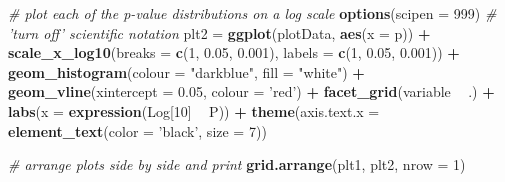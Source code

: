 \documentclass[]{book}
\newenvironment{Shaded}{\begin{snugshade}}{\end{snugshade}}
\newcommand{\CommentTok}[1]{\textcolor[rgb]{0.56,0.35,0.01}{\textit{#1}}}
\newcommand{\DataTypeTok}[1]{\textcolor[rgb]{0.13,0.29,0.53}{#1}}
\newcommand{\DecValTok}[1]{\textcolor[rgb]{0.00,0.00,0.81}{#1}}
\newcommand{\FloatTok}[1]{\textcolor[rgb]{0.00,0.00,0.81}{#1}}
\newcommand{\KeywordTok}[1]{\textcolor[rgb]{0.13,0.29,0.53}{\textbf{#1}}}
\newcommand{\NormalTok}[1]{#1}
\newcommand{\OperatorTok}[1]{\textcolor[rgb]{0.81,0.36,0.00}{\textbf{#1}}}
\newcommand{\StringTok}[1]{\textcolor[rgb]{0.31,0.60,0.02}{#1}}
\begin{document}
\begin{Shaded}
\begin{Highlighting}[]
\CommentTok{# plot each of the p-value distributions on a log scale}
\KeywordTok{options}\NormalTok{(}\DataTypeTok{scipen =} \DecValTok{999}\NormalTok{) }\CommentTok{# 'turn off' scientific notation}
\NormalTok{plt2 =}\StringTok{ }\KeywordTok{ggplot}\NormalTok{(plotData, }\KeywordTok{aes}\NormalTok{(}\DataTypeTok{x =}\NormalTok{ p)) }\OperatorTok{+}
\KeywordTok{scale_x_log10}\NormalTok{(}\DataTypeTok{breaks =} \KeywordTok{c}\NormalTok{(}\DecValTok{1}\NormalTok{, }\FloatTok{0.05}\NormalTok{, }\FloatTok{0.001}\NormalTok{),}
\DataTypeTok{labels =} \KeywordTok{c}\NormalTok{(}\DecValTok{1}\NormalTok{, }\FloatTok{0.05}\NormalTok{, }\FloatTok{0.001}\NormalTok{)) }\OperatorTok{+}
\KeywordTok{geom_histogram}\NormalTok{(}\DataTypeTok{colour =} \StringTok{"darkblue"}\NormalTok{, }\DataTypeTok{fill =} \StringTok{"white"}\NormalTok{) }\OperatorTok{+}
\KeywordTok{geom_vline}\NormalTok{(}\DataTypeTok{xintercept =} \FloatTok{0.05}\NormalTok{, }\DataTypeTok{colour =} \StringTok{'red'}\NormalTok{) }\OperatorTok{+}
\KeywordTok{facet_grid}\NormalTok{(variable }\OperatorTok{~}\StringTok{ }\NormalTok{.) }\OperatorTok{+}
\KeywordTok{labs}\NormalTok{(}\DataTypeTok{x =} \KeywordTok{expression}\NormalTok{(Log[}\DecValTok{10}\NormalTok{] }\OperatorTok{~}\StringTok{ }\NormalTok{P)) }\OperatorTok{+}
\KeywordTok{theme}\NormalTok{(}\DataTypeTok{axis.text.x =} \KeywordTok{element_text}\NormalTok{(}\DataTypeTok{color =} \StringTok{'black'}\NormalTok{, }\DataTypeTok{size =} \DecValTok{7}\NormalTok{))}

\CommentTok{# arrange plots side by side and print}
\KeywordTok{grid.arrange}\NormalTok{(plt1, plt2, }\DataTypeTok{nrow =} \DecValTok{1}\NormalTok{)}
\end{Highlighting}
\end{Shaded}
\end{document}
